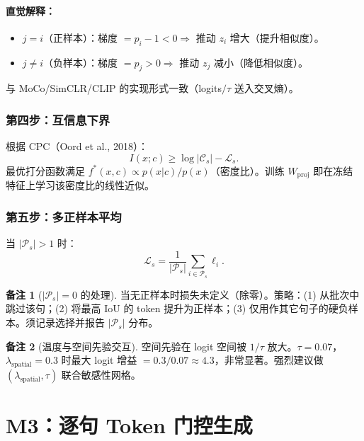 \documentclass[11pt,a4paper]{article}
\theoremstyle{definition}
\newtheorem{remark}{备注}[section]
\begin{document}
\paragraph{直觉解释：}
\begin{itemize}
    \item $j=i$（正样本）：梯度 $= p_i - 1 < 0 \Rightarrow$ 推动 $z_i$ 增大（提升相似度）。
    \item $j \neq i$（负样本）：梯度 $= p_j > 0 \Rightarrow$ 推动 $z_j$ 减小（降低相似度）。
\end{itemize}
与 MoCo/SimCLR/CLIP 的实现形式一致（logits$/\tau$ 送入交叉熵）。

\subsubsection{第四步：互信息下界}

根据 CPC（Oord et al., 2018）：
\begin{equation}
I(x; c) \geq \log |\mathcal{C}_s| - \mathcal{L}_s.
\end{equation}
最优打分函数满足 $f^*(x,c) \propto p(x|c)/p(x)$（密度比）。训练 $W_{\mathrm{proj}}$ 即在冻结特征上学习该密度比的线性近似。

\subsubsection{第五步：多正样本平均}

当 $|\mathcal{P}_s| > 1$ 时：
\begin{equation}
\mathcal{L}_s = \frac{1}{|\mathcal{P}_s|} \sum_{i \in \mathcal{P}_s} \ell_i.
\end{equation}

\begin{remark}[$|\mathcal{P}_s|=0$ 的处理]
当无正样本时损失未定义（除零）。策略：(1) 从批次中跳过该句；(2) 将最高 IoU 的 token 提升为正样本；(3) 仅用作其它句子的硬负样本。须记录选择并报告 $|\mathcal{P}_s|$ 分布。
\end{remark}

\begin{remark}[温度与空间先验交互]
空间先验在 logit 空间被 $1/\tau$ 放大。$\tau=0.07$，$\lambda_{\mathrm{spatial}}=0.3$ 时最大 logit 增益 $= 0.3/0.07 \approx 4.3$，非常显著。强烈建议做 $(\lambda_{\mathrm{spatial}}, \tau)$ 联合敏感性网格。
\end{remark}


\section{M3：逐句 Token 门控生成}
\end{document}

